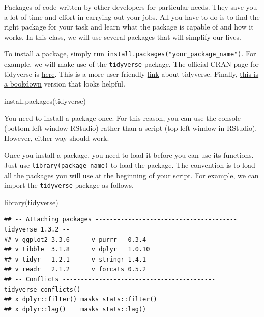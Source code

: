 \documentclass[
]{book}
\newenvironment{Shaded}{\begin{snugshade}}{\end{snugshade}}
\newcommand{\FunctionTok}[1]{\textcolor[rgb]{0.00,0.00,0.00}{#1}}
\newcommand{\NormalTok}[1]{#1}
\newcommand{\StringTok}[1]{\textcolor[rgb]{0.31,0.60,0.02}{#1}}
\begin{document}
Packages of code written by other developers for particular needs. They save you a lot of time and effort in carrying out your jobs. All you have to do is to find the right package for your task and learn what the package is capable of and how it works. In this class, we will use several packages that will simplify our lives.

To install a package, simply run \texttt{install.packages("your\_package\_name")}. For example, we will make use of the \texttt{tidyverse} package. The official CRAN page for tidyverse is \href{https://cran.r-project.org/package=tidyverse}{here}. This is a more user friendly \href{https://www.tidyverse.org}{link} about tidyverse. Finally, \href{https://bookdown.org/yih_huynh/Guide-to-R-Book/tidyverse.html}{this is a bookdown} version that looks helpful.

\begin{Shaded}
\begin{Highlighting}[]
\FunctionTok{install.packages}\NormalTok{(}\StringTok{\textquotesingle{}tidyverse\textquotesingle{}}\NormalTok{)}
\end{Highlighting}
\end{Shaded}

You need to install a package once. For this reason, you can use the console (bottom left window RStudio) rather than a script (top left window in RStudio). However, either way should work.

Once you install a package, you need to load it before you can use its functions. Just use \texttt{library(package\_name)} to load the package. The convention is to load all the packages you will use at the beginning of your script. For example, we can import the \texttt{tidyverse} package as follows.

\begin{Shaded}
\begin{Highlighting}[]
\FunctionTok{library}\NormalTok{(tidyverse)}
\end{Highlighting}
\end{Shaded}

\begin{verbatim}
## -- Attaching packages --------------------------------------- tidyverse 1.3.2 --
## v ggplot2 3.3.6      v purrr   0.3.4 
## v tibble  3.1.8      v dplyr   1.0.10
## v tidyr   1.2.1      v stringr 1.4.1 
## v readr   2.1.2      v forcats 0.5.2 
## -- Conflicts ------------------------------------------ tidyverse_conflicts() --
## x dplyr::filter() masks stats::filter()
## x dplyr::lag()    masks stats::lag()
\end{verbatim}
\end{document}
